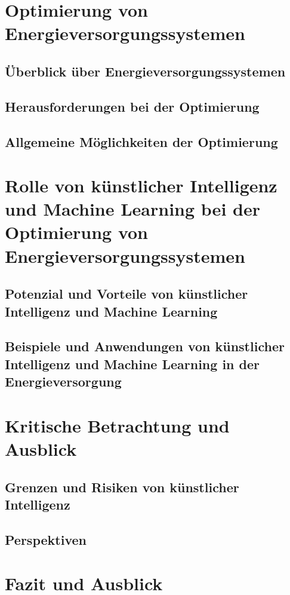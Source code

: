 \documentclass[
11pt, 
a4paper,
DIV = 14,
twoside,
twocolumn, %
parskip =half, %
headsepline, %
openright, %
]{scrreprt}
\begin{document}
	\chapter{Optimierung von Energieversorgungssystemen}
	
	\section{Überblick über Energieversorgungssystemen}
	
	\section{Herausforderungen bei der Optimierung}
	
	\section{Allgemeine Möglichkeiten der Optimierung}
	
	

	\chapter{Rolle von künstlicher Intelligenz und Machine Learning bei der Optimierung von Energieversorgungssystemen}
	
	\section{Potenzial und Vorteile von künstlicher Intelligenz und Machine Learning}
	
	\section{Beispiele und Anwendungen von künstlicher Intelligenz und Machine Learning in der Energieversorgung}
	


	\chapter{Kritische Betrachtung und Ausblick}
	
	\section{Grenzen und Risiken von künstlicher Intelligenz}
	
	\section{Perspektiven}
	


	\chapter{Fazit und Ausblick}
	
\end{document}
